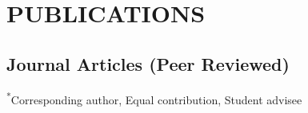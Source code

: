 \documentclass{cv}
\begin{document}

\section*{PUBLICATIONS}

\subsection*{Journal Articles (Peer Reviewed)}

{\small \textsuperscript{*}Corresponding author, \textsuperscript{\dag}Equal contribution, \textsuperscript{\ddag}Student advisee}
\end{document}
